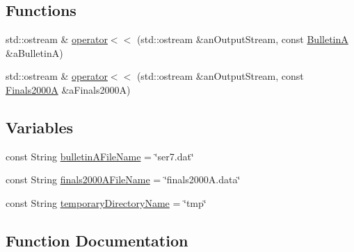 \subsection*{Functions}
\begin{DoxyCompactItemize}
\item 
std\+::ostream \& \hyperlink{namespaceostk_1_1physics_1_1coord_1_1frame_1_1provider_1_1iers_a9dfd8d1eb63538ceee276d454fec6097}{operator$<$$<$} (std\+::ostream \&an\+Output\+Stream, const \hyperlink{classostk_1_1physics_1_1coord_1_1frame_1_1provider_1_1iers_1_1_bulletin_a}{BulletinA} \&a\+BulletinA)
\item 
std\+::ostream \& \hyperlink{namespaceostk_1_1physics_1_1coord_1_1frame_1_1provider_1_1iers_abed9a04f22e79f01064d4ab9f0fc7ab4}{operator$<$$<$} (std\+::ostream \&an\+Output\+Stream, const \hyperlink{classostk_1_1physics_1_1coord_1_1frame_1_1provider_1_1iers_1_1_finals2000_a}{Finals2000A} \&a\+Finals2000A)
\end{DoxyCompactItemize}
\subsection*{Variables}
\begin{DoxyCompactItemize}
\item 
const String \hyperlink{namespaceostk_1_1physics_1_1coord_1_1frame_1_1provider_1_1iers_a5cb43c38a8bca47ff425a549b839ba52}{bulletin\+A\+File\+Name} = \char`\"{}ser7.\+dat\char`\"{}
\item 
const String \hyperlink{namespaceostk_1_1physics_1_1coord_1_1frame_1_1provider_1_1iers_afaf60ac8fac4be315f2b944146314aab}{finals2000\+A\+File\+Name} = \char`\"{}finals2000\+A.\+data\char`\"{}
\item 
const String \hyperlink{namespaceostk_1_1physics_1_1coord_1_1frame_1_1provider_1_1iers_adf91c1c8fbc2cd95d50b48f2a5cc03f2}{temporary\+Directory\+Name} = \char`\"{}tmp\char`\"{}
\end{DoxyCompactItemize}


\subsection{Function Documentation}
\mbox{\label{namespaceostk_1_1physics_1_1coord_1_1frame_1_1provider_1_1iers_a9dfd8d1eb63538ceee276d454fec6097}} 

